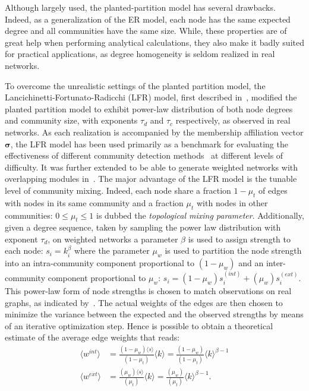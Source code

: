Although largely used, the planted-partition model has several drawbacks.
Indeed, as a generalization of the ER model, each node has the same expected degree and all communities have the same size.
While, these properties are of great help when performing analytical calculations, they also make it badly suited for practical applications, as degree homogeneity is seldom realized in real networks.

To overcome the unrealistic settings of the planted partition model, the Lancichinetti\hyp{}Fortunato\hyp{}Radicchi (LFR) model, first described in~\cite{lancichinetti2008}, modified the planted partition model to exhibit power-law distribution of both node degrees and community size, with exponents $\tau_d$ and $\tau_c$ respectively, as observed in real networks.
As each realization is accompanied by the membership affiliation vector $\boldsymbol \sigma$, the LFR model has been used primarily as a benchmark for evaluating the effectiveness of different community detection methods~\cite{fortunato2010,lancichinetti2009} at different levels of difficulty.
It was further extended to be able to generate weighted networks with overlapping modules in~\cite{lancichinetti2009a}.
The major advantage of the LFR model is the tunable level of community mixing.
Indeed, each node share a fraction $1-\mu_t$ of edges with nodes in its same community and a fraction $\mu_t$ with nodes in other communities: $0 \leq \mu_t \leq 1$ is dubbed the \emph{topological mixing parameter}.
Additionally, given a degree sequence, taken by sampling the power law distribution with exponent $\tau_d$, on weighted networks a parameter $\beta$ is used to assign strength to each node: $s_i=k_i^\beta$ where the parameter $\mu_w$ is used to partition the node strength into an intra-community component proportional to $(1-\mu_w)$ and an inter-community component proportional to $\mu_w$: $s_i = (1-\mu_w)s_i^{(int)} + (\mu_w)s_i^{(ext)}$.
This power-law form of node strengths is chosen to match observations on real graphs, as indicated by~\cite{barrat2004}.
The actual weights of the edges are then chosen to minimize the variance between the expected and the observed strengths by means of an iterative optimization step.
Hence is possible to obtain a theoretical estimate of the average edge weights that reads:
\begin{align}
\langle  w^{int} \rangle &= \frac{(1-\mu_w)\langle  s\rangle }{(1-\mu_t)}\langle  k\rangle = \frac{(1-\mu_w)}{(1-\mu_t)}\langle  k \rangle ^{\beta-1} \\
\langle  w^{ext} \rangle &= \frac{(\mu_w)\langle  s\rangle }{(\mu_t)}\langle  k\rangle = \frac{(\mu_w)}{(\mu_t)}\langle  k \rangle ^{\beta-1}.
\end{align}
